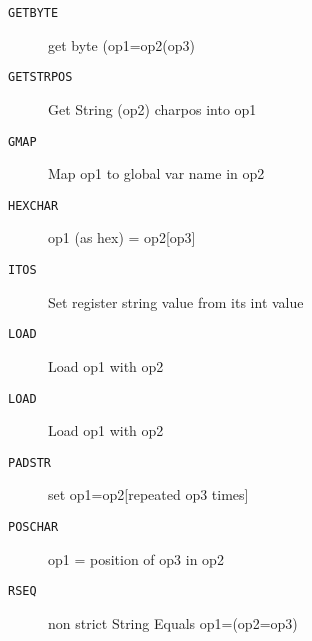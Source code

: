 \begin{description}
\item[\texttt{GETBYTE}]  get byte  (op1=op2(op3)\\

\end{description}
\begin{description}
\item[\texttt{GETSTRPOS}]  Get String (op2) charpos into op1\\

\end{description}
\begin{description}
\item[\texttt{GMAP}]  Map op1 to global var name in op2\\

\end{description}
\begin{description}
\item[\texttt{HEXCHAR}]  op1 (as hex) = op2[op3]\\

\end{description}
\begin{description}
\item[\texttt{ITOS}]  Set register string value from its int value\\

\end{description}
\begin{description}
\item[\texttt{LOAD}]  Load op1 with op2\\

\end{description}
\begin{description}
\item[\texttt{LOAD}]  Load op1 with op2\\

\end{description}
\begin{description}
\item[\texttt{PADSTR}]  set op1=op2[repeated op3 times]\\

\end{description}
\begin{description}
\item[\texttt{POSCHAR}]  op1 = position of op3 in op2\\

\end{description}
\begin{description}
\item[\texttt{RSEQ}]  non strict String Equals op1=(op2=op3)\\

\end{description}
